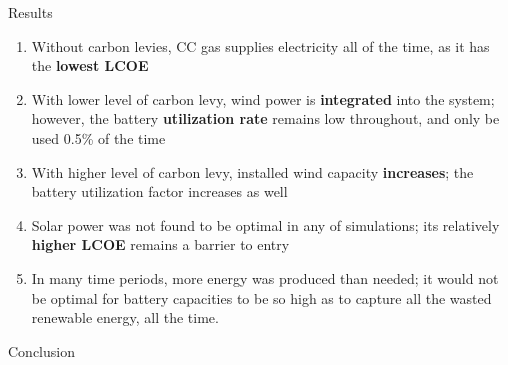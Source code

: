 \documentclass[final]{beamer}
\newlength{\onecolwid}
\begin{document}
\begin{frame}[t]
\begin{columns}[t]
\begin{column}{\onecolwid}

\begin{block}{Results}
	
\begin{enumerate}
	\item Without carbon levies, CC gas supplies electricity all of the time, as it has the \textbf{lowest LCOE} 
    \item With lower level of carbon levy, wind power is \textbf{integrated} into the system; however, the battery \textbf{utilization rate} remains low throughout, and only be used 0.5\% of the time
    \item With higher level of carbon levy, installed wind capacity \textbf{increases}; the battery utilization factor increases as well
    \item Solar power was not found to be optimal in any of simulations; its relatively \textbf{higher LCOE} remains a barrier to entry
    \item In many time periods, more energy was produced than needed; it would not be optimal for battery capacities to be so high as to capture all the wasted renewable energy, all the time. 
\end{enumerate}
%	
	
\end{block}

	


\begin{alertblock}{Conclusion}


\end{alertblock}
\end{column}
\end{columns}
\end{frame}
\end{document}
